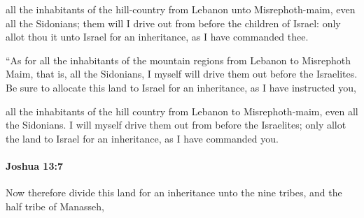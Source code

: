 			\begin{versebox}
					\item[BHS] 
					\item[ASV] all the inhabitants of the hill-country from Lebanon unto Misrephoth-maim, even all the Sidonians; them will I drive out from before the children of Israel: only allot thou it unto Israel for an inheritance, as I have commanded thee.
					\item[NIV] “As for all the inhabitants of the mountain regions from Lebanon to Misrephoth Maim, that is, all the Sidonians, I myself will drive them out before the Israelites. Be sure to allocate this land to Israel for an inheritance, as I have instructed you,
					\item[NRSV] all the inhabitants of the hill country from Lebanon to Misrephoth-maim, even all the Sidonians. I will myself drive them out from before the Israelites; only allot the land to Israel for an inheritance, as I have commanded you.
			\end{versebox}

		\paragraph{Joshua 13:7} %
			\label{JOSHUA-13-7}

			Now therefore divide this land for an inheritance unto the nine tribes, and the half tribe of Manasseh,

